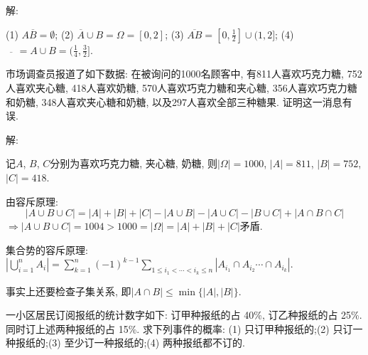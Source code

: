 \documentclass[standard]{ExBook}
\begin{document}
\begin{qitems}
\vspace{-5em}

    \begin{bbox}
解:

(1) $A\overline{B}=\emptyset$;\qquad
(2) $\overline{A}\cup B=\Omega=[0,2]$;\qquad
(3) $\overline{AB}=[0,\frac{1}{2}]\cup(1,2]$;\qquad
(4) $\overline{\mathop{\overline{A}}\mathop{\overline{B}}}=A\cup B=(\frac{1}{4},\frac{3}{2}]$.
    \end{bbox}

\vspace{-5em}

    \begin{bbox}
    \begin{shaded}
        \qitem
市场调查员报道了如下数据: 在被询问的1000名顾客中, 有811人喜欢巧克力糖, 752人喜欢夹心糖, 418人喜欢奶糖, 570人喜欢巧克力糖和夹心糖, 356人喜欢巧克力糖和奶糖, 348人喜欢夹心糖和奶糖, 以及297人喜欢全部三种糖果. 证明这一消息有误.
    \end{shaded}
    \end{bbox}

\vspace{-5em}

    \begin{bbox}
解:

记$A$, $B$, $C$分别为喜欢巧克力糖, 夹心糖, 奶糖, 则$|\Omega|=1000$, $|A|=811$, $|B|=752$, $|C|=418$.

由容斥原理: 
$$|A\cup B\cup C|=|A|+|B|+|C|-|A\cup B|-|A\cup C|-|B\cup C|+|A\cap B\cap C|$$
$\Longrightarrow$$|A\cup B\cup C|=1004 > 1000=|\Omega|=|A|+|B|+|C|$矛盾.

\textcolor{themeColor}{\selectfont {} 集合势的容斥原理: $|\bigcup\limits_{i=1}^{n}A_{i}|=\sum\limits_{k=1}^{n}(-1)^{k-1}\sum\limits_{1\leq i_{1}<\cdots<i_{k}\leq n}|A_{i_{1}}\cap A_{i_{2}}\cdots\cap A_{i_{k}}|$.}

\textcolor{themeColor}{\selectfont {} 事实上还要检查子集关系, 即$|A\cap B|\leq\min\{|A|,|B|\}$.}
    \end{bbox}

\vspace{-5em}

    \begin{bbox}
    \begin{shaded}
        \qitem
一小区居民订阅报纸的统计数字如下: 订甲种报纸的占 40\%, 订乙种报纸的占 25\%. 同时订上述两种报纸的占 15\%. 求下列事件的概率: (1) 只订甲种报纸的;\qquad(2) 只订一种报纸的;\qquad(3) 至少订一种报纸的;\qquad(4) 两种报纸都不订的.
    \end{shaded}
    \end{bbox}


\end{qitems}
\end{document}
